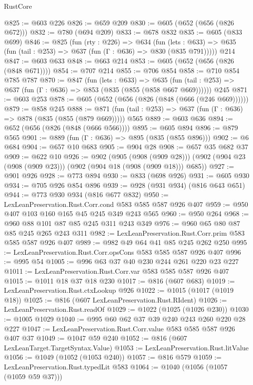 \begin{lexlean}{RustCore}
\begin{coremodule}
@825 := @603 @226
@826 := @659 @209
@830 := @605 (@652 (@656 (@826 @672)))
@832 := @780 (@694 @209)
@833 := @678 @832
@835 := @605 (@833 @699)
@846 := @825
    (fun (rty : @226) =>
    @634
      (fun (lets : @633) => @635 (fun (tail : @253) => @637 (fun (Γ : @636) => @830 (@835 @791)))))
    @214
@847 := @603 @633
@848 := @663 @214
@853 := @605 (@652 (@656 (@826 (@848 @671))))
@854 := @707 @214
@855 := @706 @854
@858 := @710 @854 @785 @787
@870 := @847
    (fun (lets : @633) =>
    @635 (fun (tail : @253) => @637 (fun (Γ : @636) => @853 (@835 (@855 (@858 @667 @669))))))
    @245
@871 := @603 @253
@878 := @605 (@652 (@656 (@826 (@848 (@666 (@246 @669))))))
@879 := @858 @245
@888 := @871 (fun (tail : @253) => @637 (fun (Γ : @636) => @878 (@835 (@855 (@879 @669))))) @565
@889 := @603 @636
@894 := @652 (@656 (@826 (@848 (@666 @566))))
@895 := @605 @894
@896 := @879 @565
@901 := @889 (fun (Γ : @636) => @895 (@835 (@855 @896)))
@902 := @6 @684
@904 := @657 @10 @683
@905 := @904 @28
@908 := @657 @35 @682 @37
@909 := @622 @10
@926 := @902
    (@905 (@908 (@909 @28)))
    (@902 (@904 @23 (@908 (@909 @23))) (@902 (@904 @18 (@908 (@909 @18))) @685))
@927 := @901 @926
@928 := @773 @894
@930 := @833 (@698 @926)
@931 := @605 @930
@934 := @705 @926 @854 @896
@939 := @928 (@931 @934) (@816 @643 @651)
@944 := @773 @930 @934 (@816 @677 @832)
@950 := LexLeanPreservation.Rust.Corr.cond @583 @585 @587 @926 @407
@959 := @950 @407 @103 @160 @165 @45 @245 @349 @243 @565
@960 := @950 @264
@968 := @960 @88 @101 @87 @85 @245 @311 @243 @349
@976 := @960 @65 @80 @87 @85 @245 @265 @243 @311
@982 := LexLeanPreservation.Rust.Corr.prim @583 @585 @587 @926 @407
@989 := @982 @49 @64 @41 @85 @245 @262 @250
@995 := LexLeanPreservation.Rust.Corr.opsCons @583 @585 @587 @926 @407
@996 := @995 @54
@1005 := @996 @63 @37 @40 @230 @244 @261 @220 @23 @227
@1011 := LexLeanPreservation.Rust.Corr.var @583 @585 @587 @926 @407
@1015 := @1011 @18 @37 @18 @230
@1017 := @816 (@607 @683)
@1019 := LexLeanPreservation.Rust.ctxLookup @926
@1022 := @1015 (@1017 (@1019 @18))
@1025 := @816 (@607 LexLeanPreservation.Rust.RIdent)
@1026 := LexLeanPreservation.Rust.readOf
@1029 := @1022 (@1025 (@1026 @230))
@1030 := @1005 @1029
@1040 := @995 @60 @62 @37 @39 @240 @243 @260 @220 @28 @227
@1047 := LexLeanPreservation.Rust.Corr.value @583 @585 @587 @926 @407 @37
@1049 := @1047 @59 @240
@1052 := @816 (@607 LexLeanTarget.TargetSyntax.Value)
@1053 := LexLeanPreservation.Rust.litValue
@1056 := @1049 (@1052 (@1053 @240))
@1057 := @816 @579
@1059 := LexLeanPreservation.Rust.typedLit @583
@1064 := @1040 (@1056 (@1057 (@1059 @59 @37)))

\end{coremodule}
\end{lexlean}
